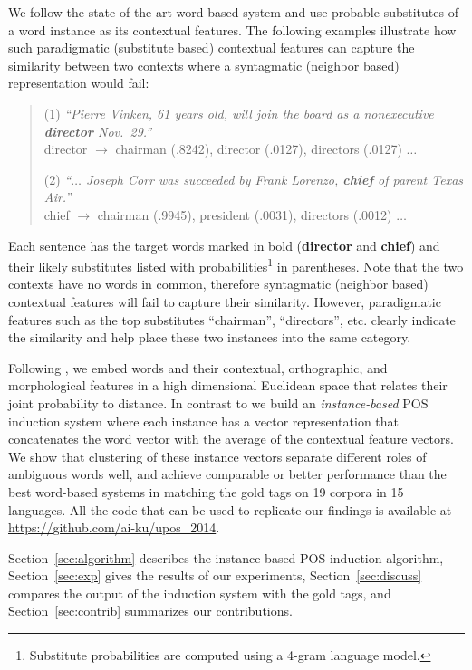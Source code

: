We follow the state of the art word-based system
\cite{yatbaz-sert-yuret:2012:EMNLP-CoNLL} and use probable substitutes
of a word instance as its contextual features.  The following examples
illustrate how such paradigmatic (substitute based) contextual
features can capture the similarity between two contexts where a
syntagmatic (neighbor based) representation would fail:
\vspace*{5mm}
\begin{quotation}
(1) {\em ``Pierre Vinken, 61 years old, will join the board
  as a nonexecutive {\bf director} Nov.~29.''} 
\\ director $\rightarrow$ chairman
(.8242), director (.0127), directors (.0127) $\ldots$

(2) {\em ``$\ldots$ Joseph Corr was succeeded by Frank
  Lorenzo, {\bf chief} of parent Texas Air.''} 
\\ chief $\rightarrow$ chairman
(.9945), president (.0031), directors (.0012) $\ldots$
\end{quotation}

Each sentence has the target words marked in bold ({\bf director} and
{\bf chief}) and their likely substitutes listed with
probabilities\footnote{Substitute probabilities are computed using a
  4-gram language model.} in parentheses.  Note that the two contexts
have no words in common, therefore syntagmatic (neighbor based)
contextual features will fail to capture their similarity.  However,
paradigmatic features such as the top substitutes ``chairman'',
``directors'', etc.  clearly indicate the similarity and help place
these two instances into the same category.

Following \cite{globerson2007euclidean}, we embed words and their
contextual, orthographic, and morphological features in a high
dimensional Euclidean space that relates their joint probability to
distance.  In contrast to \cite{yatbaz-sert-yuret:2012:EMNLP-CoNLL} we
build an {\em instance-based} POS induction system where each instance
has a vector representation that concatenates the word vector with the
average of the contextual feature vectors.  We show that clustering of
these instance vectors separate different roles of ambiguous words
well, and achieve comparable or better performance than the best
word-based systems in matching the gold tags on 19 corpora in 15
languages.  All the code that can be used to replicate our findings is
available at \url{https://github.com/ai-ku/upos_2014}.

Section~\ref{sec:algorithm} describes the instance-based POS induction
algorithm, Section~\ref{sec:exp} gives the results of our experiments,
Section~\ref{sec:discuss} compares the output of the induction system
with the gold tags, and Section~\ref{sec:contrib} summarizes our
contributions.
